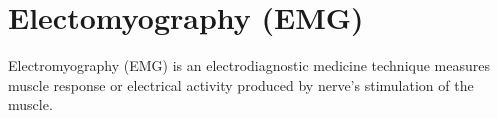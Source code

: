 \section{Electomyography (EMG)}
Electromyography (EMG) is an electrodiagnostic medicine technique measures muscle response or electrical activity produced by nerve’s stimulation of the muscle.


